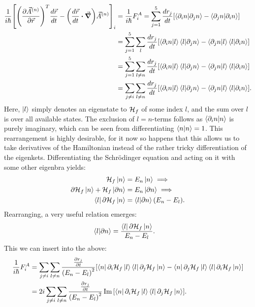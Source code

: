 \documentclass[a4paper]{article}
\begin{document}
\begin{align*}
             \frac{1}{i\hbar{}}\bqty{\pqty{\frac{\partial \va{A}^{(n)}}{\partial \va{r}}}^T \frac{d
\va{r}}{d t} - \pqty{\frac{d \va{r}}{d t}  \vdot \grad}\va{A}^{(n)}}_i
 &= \frac{1}{i\hbar{}}F_{i}^A = \sum_{j=1}^{5} \frac{d
        r_j}{d t} \bqty{\bra{\partial_i n}\ket{\partial_j n}-\bra{\partial_j n}\ket{\partial_i
        n}}\\
        &= \sum_{j=1}^{5} \sum_{l} \frac{d r_j}{d t}\bqty{\bra{\partial_i
                n}\ket{l}\bra{l}\ket{\partial_j n}- \bra{\partial_j
        n}\ket{l}\bra{l}\ket{\partial_i n}}\\
        &= \sum_{j=1}^{5} \sum_{l \ne n} \frac{d r_j}{d t}\bqty{\bra{\partial_i
                n}\ket{l}\bra{l}\ket{\partial_j n}- \bra{\partial_j
        n}\ket{l}\bra{l}\ket{\partial_i n}}\\
        &= \sum_{j\ne i} \sum_{l \ne n} \frac{d r_j}{d t}\bqty{\bra{\partial_i
                n}\ket{l}\bra{l}\ket{\partial_j n}- \bra{\partial_j
        n}\ket{l}\bra{l}\ket{\partial_i n}}
.\end{align*}
Here, \(\ket{l}\) simply denotes an eigenstate to \(\mathbb{\cal H}_{f}\) of some index
\(l\), and the sum over \(l\) is over all available states. The exclusion of \(l=n\)-terms follows as
\(\bra{\partial_i n}\ket{n}\) is purely imaginary, which can be seen from differentiating
\(\bra{n}\ket{n} = 1\). This rearrangement is highly desirable, for it now so happens that this
allows us to take derivatives of the Hamiltonian instead of the rather tricky
differentiation of the eigenkets. Differentiating the Schrödinger equation and acting on it
with some other eigenbra yields:
\begin{align*}
        \mathbb{\cal H}_f \ket{n} &= E_n \ket{n} \implies\\
        \partial \mathbb{\cal H}_f \ket{n} + \mathbb{\cal H}_f \ket{\partial n} &= E_n
        \ket{\partial n} \implies\\
        \bra{l}\partial \mathbb{\cal H}_f \ket{n} &= \bra{l}\ket{\partial n}(E_n - E_l)
.\end{align*}
Rearranging, a very useful relation emerges:
\begin{align}\label{eq:Hdiff}
        \bra{l}\ket{\partial n} &= \frac{\bra{l}\partial \mathbb{\cal H}_f \ket{n}}{E_n
        - E_l}
.\end{align}
This we can insert into the above:
\begin{align}\label{eq:FA}
\frac{1}{i\hbar{}}F_i^A &= \sum_{j\ne i} \sum_{l \ne n} \frac{\frac{\partial r_j}{\partial
        t}}{\pqty{E_n-E_l}^2}\bqty{\bra{n}\partial_i \mathbb{\cal H}_f
        \ket{l}\bra{l}\partial_j\mathbb{\cal H}_f\ket{n} - \bra{n}\partial_j \mathbb{\cal
        H}_f\ket{l}\bra{l}\partial_i \mathbb{\cal H}_f\ket{n}}\nonumber\\
        &= 2i\sum_{j\ne i} \sum_{l \ne n} \frac{\frac{\partial r_j}{\partial
        t}}{\pqty{E_n-E_l}^2} \Im \bqty{\bra{n}\partial_i \mathbb{\cal H}_f
        \ket{l}\bra{l}\partial_j\mathbb{\cal H}_f\ket{n}}
.\end{align}
\end{document}
